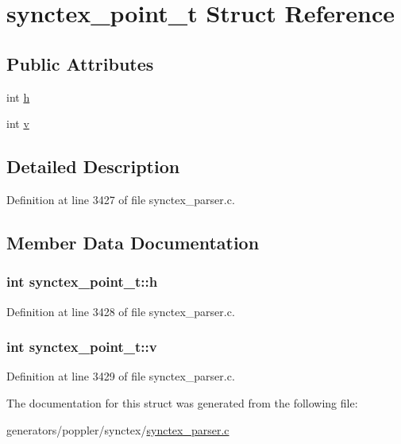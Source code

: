 \hypertarget{structsynctex__point__t}{\section{synctex\+\_\+point\+\_\+t Struct Reference}
\label{structsynctex__point__t}
}
\subsection*{Public Attributes}
\begin{DoxyCompactItemize}
\item 
int \hyperlink{structsynctex__point__t_ac3f7563da1a5c828a3c5f73da1437336}{h}
\item 
int \hyperlink{structsynctex__point__t_a47fa1080adf9e08e535c80b9854cf186}{v}
\end{DoxyCompactItemize}


\subsection{Detailed Description}


Definition at line 3427 of file synctex\+\_\+parser.\+c.



\subsection{Member Data Documentation}
\hypertarget{structsynctex__point__t_ac3f7563da1a5c828a3c5f73da1437336}{
\subsubsection[{h}]{\setlength{\rightskip}{0pt plus 5cm}int synctex\+\_\+point\+\_\+t\+::h}}\label{structsynctex__point__t_ac3f7563da1a5c828a3c5f73da1437336}


Definition at line 3428 of file synctex\+\_\+parser.\+c.

\hypertarget{structsynctex__point__t_a47fa1080adf9e08e535c80b9854cf186}{
\subsubsection[{v}]{\setlength{\rightskip}{0pt plus 5cm}int synctex\+\_\+point\+\_\+t\+::v}}\label{structsynctex__point__t_a47fa1080adf9e08e535c80b9854cf186}


Definition at line 3429 of file synctex\+\_\+parser.\+c.



The documentation for this struct was generated from the following file\+:\begin{DoxyCompactItemize}
\item 
generators/poppler/synctex/\hyperlink{synctex__parser_8c}{synctex\+\_\+parser.\+c}\end{DoxyCompactItemize}
